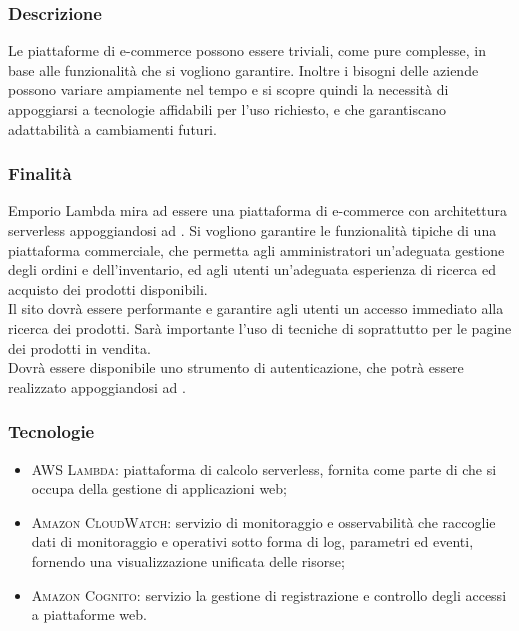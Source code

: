 \documentclass[]{article}
\begin{document}
			\subsubsection{Descrizione}
			Le piattaforme di e-commerce possono essere triviali, come pure complesse, in base alle funzionalità che si vogliono garantire. Inoltre i bisogni delle aziende possono variare ampiamente nel tempo e si scopre quindi la necessità di appoggiarsi a tecnologie affidabili per l'uso richiesto, e che garantiscano adattabilità a cambiamenti futuri.

			\subsubsection{Finalità}
			Emporio Lambda mira ad essere una piattaforma di e-commerce con architettura serverless appoggiandosi ad . Si vogliono garantire le funzionalità tipiche di una piattaforma commerciale, che permetta agli amministratori un'adeguata gestione degli ordini e dell'inventario, ed agli utenti un'adeguata esperienza di ricerca ed acquisto dei prodotti disponibili.
			\\
			Il sito dovrà essere performante e garantire agli utenti un accesso immediato alla ricerca dei prodotti. Sarà importante l'uso di tecniche di  soprattutto per le pagine dei prodotti in vendita.
			\\
			Dovrà essere disponibile uno strumento di autenticazione, che potrà essere realizzato appoggiandosi ad .

			\subsubsection{Tecnologie}
			\begin{itemize}
				\item \textsc{AWS Lambda:} piattaforma di calcolo serverless, fornita come parte di  che si occupa della gestione  di applicazioni web;
				\item \textsc{Amazon CloudWatch:} servizio di monitoraggio e osservabilità che raccoglie dati di monitoraggio e operativi sotto forma di log, parametri ed eventi, fornendo una visualizzazione unificata delle risorse;
				\item \textsc{Amazon Cognito:} servizio la gestione di registrazione e controllo degli accessi a piattaforme web.
			\end{itemize}
\end{document}
